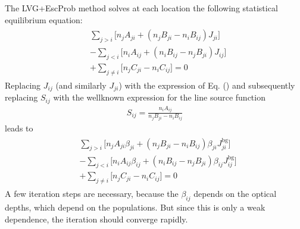 \documentclass[letterpaper,10pt,english]{sphinxmanual}
\begin{document}
The LVG+EscProb method solves at each location the following statistical
equilibrium equation:
\begin{equation*}
\begin{split}\begin{split}
& \sum_{j>i} \Big[ n_jA_{ji} + (n_jB_{ji}-n_iB_{ij})J_{ji}\Big]\\
& - \sum_{j<i} \Big[ n_iA_{ij} + (n_iB_{ij}-n_jB_{ji})J_{ij}\Big]\\
& + \sum_{j\neq i}\big[n_jC_{ji}-n_iC_{ij}\big]=0
\end{split}\end{split}
\end{equation*}
Replacing \(J_{ij}\) (and similarly \(J_{ji}\)) with the expression of
Eq. () and subsequently replacing \(S_{ij}\) with
the well\sphinxhyphen{}known expression for the line source function
\begin{equation*}
\begin{split}S_{ij} = \frac{n_iA_{ij}}{n_jB_{ji}-n_iB_{ij}}\end{split}
\end{equation*}
leads to
\begin{equation*}
\begin{split}\begin{split}
& \sum_{j>i} \Big[ n_jA_{ji}\beta_{ji} + (n_jB_{ji}-n_iB_{ij})\beta_{ji}J^{\mathrm{bg}}_{ji}\Big]\\
& - \sum_{j<i} \Big[ n_iA_{ij}\beta_{ij} + (n_iB_{ij}-n_jB_{ji})\beta_{ij}J^{\mathrm{bg}}_{ij}\Big]\\
& + \sum_{j\neq i}\big[n_jC_{ji}-n_iC_{ij}\big]=0
\end{split}\end{split}
\end{equation*}
A few iteration steps are necessary, because the \(\beta_{ij}\) depends on the
optical depths, which depend on the populations. But since this is only a
weak dependence, the iteration should converge rapidly.
\end{document}
